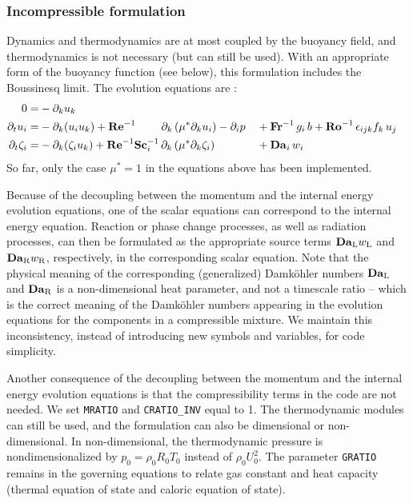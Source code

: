 \subsubsection{Incompressible formulation}

Dynamics and thermodynamics are at most coupled by the buoyancy field, and thermodynamics is not necessary (but can still be used). With an appropriate form of the buoyancy function (see below), this formulation includes the Boussinesq limit. The evolution equations are :
\begin{subequations}
    \begin{align}
        0                   =& -\partial_k u_k                                          \\
        \partial_t  u_i     =& -\partial_k ( u_i u_k )  
        +\mathrm{\bf Re}^{-1}\qquad\;\partial_k \left( \mu^{*} \partial_k u_i\right)  -\partial_i p&&
        +\mathrm{\bf Fr}^{-1}\, g_i\,b +\mathrm{\bf Ro}^{-1}\,\epsilon_{ijk} f_k\,u_j  \\
        \partial_t \zeta_i  =& -\partial_k (\zeta_i u_k)                    
        +\mathrm{\bf Re}^{-1}\mathrm{\bf Sc}_i^{-1}\, \partial_k \left( \mu^{*}\partial_k\zeta_i\right) &&+ \mathrm{\bf Da}_i\,w_i
    \end{align}
\end{subequations}
So far, only the case $\mu^*=1$ in the equations above has been implemented.

Because of the decoupling between the momentum and the internal energy evolution equations, one of the scalar equations can correspond to the internal energy equation. Reaction or phase change processes, as well as radiation processes, can then be formulated as the appropriate source terms $\mathrm{\bf   Da}_\mathrm{L}w_\mathrm{L}$ and $\mathrm{\bf Da}_\mathrm{R}w_\mathrm{R}$, respectively, in the corresponding scalar equation. Note that the physical meaning of the corresponding (generalized) Damk{\"o}hler numbers $\mathrm{\bf   Da}_\mathrm{L}$ and $\mathrm{\bf Da}_\mathrm{R}$ is a non-dimensional heat parameter, and not a timescale ratio -- which is the correct meaning of the Damk{\"o}hler numbers appearing in the evolution equations for the components in a compressible mixture. We maintain this inconsistency, instead of introducing new symbols and variables, for code simplicity.

Another consequence of the decoupling between the momentum and the internal energy evolution equations is that the compressibility terms in the code are not needed. We set \texttt{MRATIO} and \texttt{CRATIO\_INV} equal to 1. The thermodynamic modules can still be used, and the formulation can also be dimensional or non-dimensional. In non-dimensional, the thermodynamic pressure is nondimensionalized by $p_0=\rho_0R_0T_0$ instead of $\rho_0U_0^2$. The parameter \texttt{GRATIO} remains in the governing equations to relate gas constant and heat capacity (thermal equation of state and caloric equation of state).

